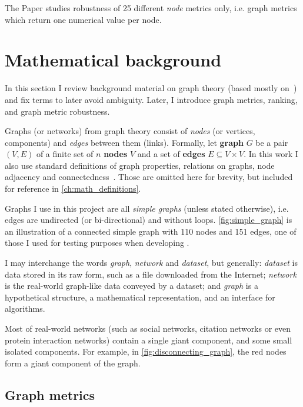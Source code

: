 The Paper studies robustness of 25 different \textsl{node} metrics only, i.e. graph metrics which return one numerical value per node.


\section{Mathematical background}\label{sec:math_background}

In this section I review background material on graph theory (based mostly on~\cite{Estrada2017}) and fix terms to later avoid ambiguity.
Later, I introduce graph metrics, ranking, and graph metric robustness.



Graphs (or networks) from graph theory consist of \textit{nodes} (or vertices, components) and \textit{edges} between them (links).
Formally, let \textbf{graph} $G$ be a pair $(V, E)$ of a finite set of $n$ \textbf{nodes} $V$ and a set of \textbf{edges} $E \subseteq V \times V$.
In this work I also use standard definitions of graph properties, relations on graphs, node adjacency and connectedness~\cite{Estrada2017}.
Those are omitted here for brevity, but included for reference in \cref{ch:math_definitions}.

Graphs I use in this project are all \textsl{simple graphs} (unless stated otherwise), i.e. edges are undirected (or bi-directional) and without loops.
\autoref{fig:simple_graph} is an illustration of a connected simple graph with 110 nodes and 151 edges, one of those I used for testing purposes when developing \graffs.

I may interchange the words \textsl{graph}, \textsl{network} and \textsl{dataset}, but generally: \textsl{dataset} is data stored in its raw form, such as a file downloaded from the Internet; \textsl{network} is the real-world graph-like data conveyed by a dataset; and \textsl{graph} is a hypothetical structure, a mathematical representation, and an interface for algorithms.



Most of real-world networks (such as social networks, citation networks or even protein interaction networks) contain a single giant component, and some small isolated components.
For example, in \autoref{fig:disconnecting_graph}, the red nodes form a giant component of the graph.

\subsection{Graph metrics}

